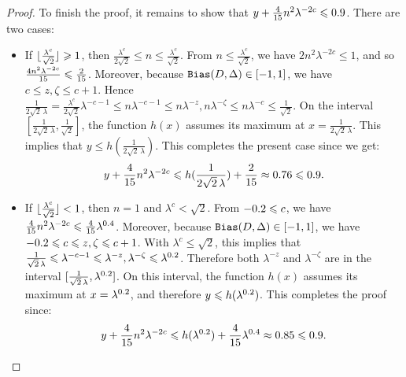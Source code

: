 \begin{proof}
\noindent
To finish the proof, it remains to show that 
$y+\frac{4}{\formula{\P}}n^2\lambda^{-2c}\leq \formula{\Qstep}$.  There
are two cases:
\begin{itemize}
  \item If $\lfloor\frac{\lambda^{c}}{\sqrt{2}}\rfloor\geqslant 1$, 
  then $\frac{\lambda^{c}}{2\sqrt{2}}\leq n\leq 
  \frac{\lambda^{c}}{\sqrt{2}}$. From $n\leq
  \frac{\lambda^{c}}{\sqrt{2}}$, we have $2n^2\lambda^{-2c}\leq 1$, and
  so
  $\frac{4n^2\lambda^{-2c}}{\formula{\P}}\leq \frac{2}
  {\formula{\P}}$. Moreover, because $\mathtt{Bias}(D,\Delta)\in[-1,1]$, we have
  $c\leq z,\zeta\leq c+1$. Hence $\frac{1}{2\sqrt{2}\,\lambda}
  = \frac{\lambda^{c}}{2\sqrt{2}}\lambda^{-c-1}\leq n\lambda^{-c-1}\leq
  n{\lambda^{-z}}, n{\lambda^{-\zeta}} \leq n\lambda^{-c}\leq
  \frac{1}{\sqrt{2}}$. On the interval $[\frac{1}{2\sqrt{2}\,\lambda},
  \frac{1}{\sqrt{2}}]$, the function $h(x)$ assumes its maximum at
  $x=\frac{1}{2\sqrt{2}\,\lambda}$. This implies that $y\leq
  h(\frac{1}{2\sqrt{2}\,\lambda})$. This
  completes the present case since we get:
  \[
  y+ \frac{4}{\formula{\P}}n^2\lambda^{-2c}\leq 
  h(\frac{1}{2\sqrt{2}\,\lambda}) +\frac{2}{\P} 
  \approx \formula{(1 - sqrt(2)*(1/(2*sqrt(2)*\l)))^2 + (2/\P)}
  \leq \formula{\Qstep}.
  \]
  \item If $\lfloor\frac{\lambda^{c}}{\sqrt{2}}\rfloor< 1$, 
  then $n=1$ and $\lambda^c<\sqrt{2}$. 
  From $\formula{-\b}\leq c$, we have  $\frac{4}{\formula{\P}}n^2\lambda^{-2c}
  \leq \frac{4}{\formula{\P}}\lambda^{\formula{2*\b}}$. Moreover, because
  $\mathtt{Bias}(D,\Delta)\in[-1,1]$, we have
  $\formula{-\b}\leq c\leq z,\zeta\leq c+1$.
  With $\lambda^c\leq\sqrt{2}$, this implies that
  $\frac{1}{\sqrt{2}\,\lambda} \leq \lambda^{-c-1}\leq {\lambda^{-z}}, {\lambda^{-\zeta}} \leq 
  \lambda^{\formula{\b}}$. Therefore both $\lambda^{-z}$ and
  $\lambda^{-\zeta}$ are in the interval
  $[\frac{1}{\sqrt{2}\,\lambda},\lambda^{\formula{\b}}]$.
  On this interval, the function $h(x)$ assumes its maximum at
  $x=\lambda^{\formula{\b}}$, and therefore $y\leq
  h(\lambda^{\formula{\b}})$. 
  This completes the proof since:
  \[
  y+\frac{4}{\formula{\P}}n^2\lambda^{-2c}\leq 
  h(\lambda^{\formula{\b}})
  + \frac{4}{\formula{\P}}\lambda^{\formula{2*\b}}
  \approx\formula{((max((1 - sqrt(2)*(1/(sqrt(2)*\l)))^2,
  (1-sqrt(2)*((\l)^(\b)))^2) + (4/\P * (\l^(2*\b))))}
  \leq \formula{\Qstep}.
  \]
\end{itemize}
\end{proof}

